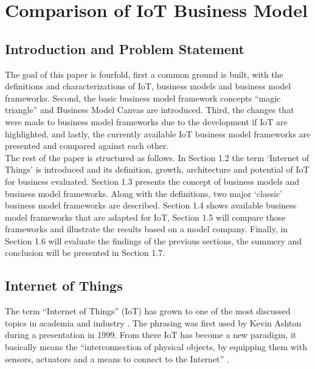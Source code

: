 
\chapter{Comparison of IoT Business Model}


\newpage

\minitoc %

\newpage
\renewcommand{\labelitemii}{$\diamond$}
\renewcommand{\labelitemiii}{$\circ$}
\section{Introduction and Problem Statement}
The goal of this paper is fourfold, first a common ground is built, with the definitions and characterizations of IoT, business models and business model frameworks. Second, the basic business model framework concepts ``magic triangle'' and  Business Model Canvas are introduced. Third, the changes that were made to business model frameworks due to the development if IoT are highlighted, and lastly, the currently available IoT business model frameworks are presented and compared against each other.\\
The rest of the paper is structured as follows. In Section 1.2 the term `Internet of Things' is introduced and its definition, growth, architecture and potential of IoT for business evaluated. Section 1.3 presents the concept of business models and business model frameworks. Along with the definitions, two major `classic' business model frameworks are described. Section 1.4 shows available business model frameworks that are adapted for IoT, Section 1.5 will compare those frameworks and illustrate the results based on a model company. Finally, in Section 1.6 will evaluate the findings of the previous sections, the summery and conclusion will be presented in Section 1.7. 
 
\section{Internet of Things}
The term ``Internet of Things'' (IoT) has grown to one of the most discussed topics in academia and industry \cite{ju}. The phrasing was first used by Kevin Ashton during a presentation in 1999. From there IoT has become a new paradigm, it basically means the ``interconnection of physical objects, by equipping them with sensors, actuators and a means to connect to the Internet'' \cite{dijkman}.

